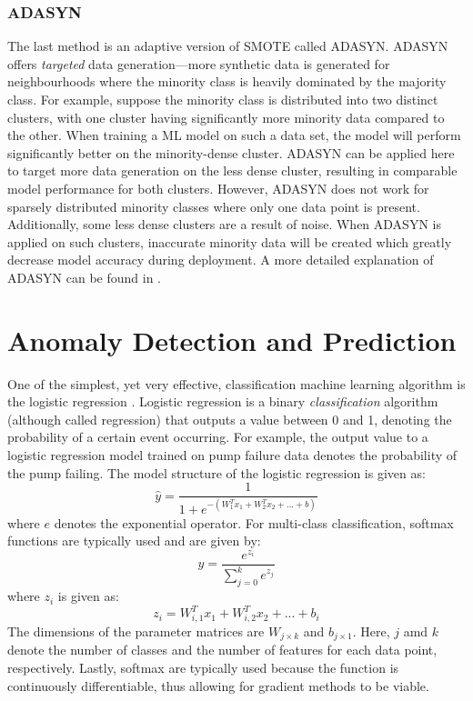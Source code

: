 \subsubsection{ADASYN}
The last method is an adaptive version of SMOTE called ADASYN. ADASYN offers \textit{targeted} data generation---more synthetic data is generated for neighbourhoods where the minority class is heavily dominated by the majority class.  For example, suppose the minority class is distributed into two distinct clusters, with one cluster having significantly more minority data compared to the other.  When training a ML model on such a data set, the model will perform significantly better on the minority-dense cluster.  ADASYN can be applied here to target more data generation on the less dense cluster, resulting in comparable model performance for both clusters.  However, ADASYN does not work for sparsely distributed minority classes where only one data point is present.  Additionally, some less dense clusters are a result of noise.  When ADASYN is applied on such clusters, inaccurate minority data will be created which greatly decrease model accuracy during deployment. A more detailed explanation of ADASYN can be found in \cite{adasyn}.


\section{Anomaly Detection and Prediction}
One of the simplest, yet very effective, classification machine learning algorithm is the logistic regression \cite{log_reg}. Logistic regression is a binary \textit{classification} algorithm (although called regression) that outputs a value between 0 and 1, denoting the probability of a certain event occurring.  For example, the output value to a logistic regression model trained on pump failure data denotes the probability of the pump failing. The model structure of the logistic regression is given as:
\begin{equation}
    \hat{y} = \frac{1}{1 + e^{-(W_1^Tx_1 + W_2^Tx_2 + ... + b)}}
    \label{eq:02LogS}
\end{equation}
where $e$ denotes the exponential operator.  For multi-class classification, softmax functions are typically used and are given by:
\begin{equation}
    y = \frac{e^{z_i}}{\sum\limits^k_{j=0}e^{z_j}}
    \label{eq:03softmax}
\end{equation}
where $z_i$ is given as:
$$z_i = W_{i, 1}^Tx_1 + W_{i, 2}^Tx_2 + ... + b_i$$
The dimensions of the parameter matrices are $W_{j \times k}$ and $b_{j \times 1}$.  Here, $j$ amd $k$ denote the number of classes and the number of features for each data point, respectively.  Lastly, softmax are typically used because the function is continuously differentiable, thus allowing for gradient methods to be viable.


